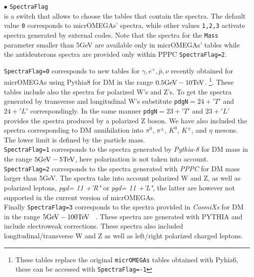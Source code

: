 \documentclass[12pt,a4paper]{article}
\begin{document}
\noindent
$\bullet$   \verb|SpectraFlag| \\
 is a switch that allows to choose the tables that contain the spectra. The default value {\tt 0} corresponds to micrOMEGAs' spectra, while other values {\tt 1,2,3}
activate spectra generated by external codes. Note that the spectra for the {\tt Mass} parameter smaller than 5GeV are available only in
 micrOMEGAs' tables while  the antideuterons spectra are  provided  only within  PPPC {\tt SpectraFlag=2}.     


{\tt SpectraFlag=0} corresponds to  new tables for $\gamma, e^+,\bar{p},\nu$ recently obtained for micrOMEGAs using Pythia8
  for  DM in the range  $0.5{\rm  GeV} - 10{\rm TeV}$. \footnote {These tables replace the original {\tt micrOMEGAs} tables obtained with Pyhia6, these can be accessed with {\tt SpectraFlag=-1}}.
 These tables include also the spectra for polarized W's and Z's.
To get the spectra generated by transverse and longitudinal W's substitute 
\verb|pdgN|$=24+'T'$ and $24+'L'$ correspondingly. In the same manner \verb|pdgN|$=23+'T'$ and
$23+'L'$  provides the spectra produced by a polarized Z boson.  We  have also included the spectra corresponding to  DM annihilation into $\pi^0$, $\pi^{\pm}$, $K^0$, $K^\pm$, and  $\eta$ mesons. The lower limit is defined by the particle mass.\\
{\tt SpectraFlag=1} corresponds to the spectra generated by {\it Pythia-8} \cite{Amoroso:2018qga, Jueid:2022qjg} for DM mass in the range  $5{\rm  GeV} - 5{\rm TeV}$, here polarization is not taken into account.\\
{\tt SpectraFlag=2} corresponds to the 
 spectra generated with {\it PPPC}  \cite{Ciafaloni_2011,Marco_Cirelli_2011} for DM mass larger than 5GeV. The spectra take into account polarized W and Z,  as well as
polarized leptons, {\it  pgd= 11 +'R"} or {\it  pgd= 11 +'L"},  the latter are however not supported
in the current version of micrOMEGAs.  \\
Finally {\tt SpectraFlag=3} corresponds to the  spectra  provided in  {\it CosmiXs} for DM in the range  $5{\rm  GeV} - 100{\rm TeV}$ ~\cite{Arina:2023eic}. These spectra are generated with PYTHIA and include electroweak corrections. These  spectra also included longitudinal/transverse  W and Z  as well as  left/right polarized  charged leptons.
\end{document}

